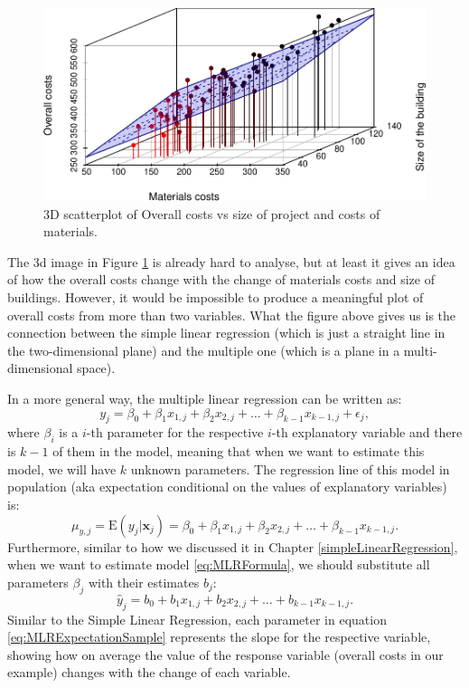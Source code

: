 \documentclass[
]{book}
\theoremstyle{definition}
\theoremstyle{definition}
\theoremstyle{definition}
\theoremstyle{definition}
\theoremstyle{remark}
\begin{document}
\begin{figure}
\centering
\includegraphics{Svetunkov---Statistics-for-Business-Analytics_files/figure-latex/scatterplot3dProjectCosts-1.pdf}
\caption{\label{fig:scatterplot3dProjectCosts}3D scatterplot of Overall costs vs size of project and costs of materials.}
\end{figure}

The 3d image in Figure \ref{fig:scatterplot3dProjectCosts} is already hard to analyse, but at least it gives an idea of how the overall costs change with the change of materials costs and size of buildings. However, it would be impossible to produce a meaningful plot of overall costs from more than two variables. What the figure above gives us is the connection between the simple linear regression (which is just a straight line in the two-dimensional plane) and the multiple one (which is a plane in a multi-dimensional space).

In a more general way, the multiple linear regression can be written as:
\begin{equation}
    y_j = \beta_0 + \beta_1 x_{1,j} + \beta_2 x_{2,j} + \dots + \beta_{k-1} x_{k-1,j} + \epsilon_j ,
    \label{eq:MLRFormula}
\end{equation}
where \(\beta_i\) is a \(i\)-th parameter for the respective \(i\)-th explanatory variable and there is \(k-1\) of them in the model, meaning that when we want to estimate this model, we will have \(k\) unknown parameters. The regression line of this model in population (aka expectation conditional on the values of explanatory variables) is:
\begin{equation}
    \mu_{y,j} = \mathrm{E}(y_j | \mathbf{x}_j) = \beta_0 + \beta_1 x_{1,j} + \beta_2 x_{2,j} + \dots + \beta_{k-1} x_{k-1,j} .
    \label{eq:MLRExpectation}
\end{equation}
Furthermore, similar to how we discussed it in Chapter \ref{simpleLinearRegression}, when we want to estimate model \eqref{eq:MLRFormula}, we should substitute all parameters \(\beta_j\) with their estimates \(b_j\):
\begin{equation}
    \hat{y}_j = b_0 + b_1 x_{1,j} + b_2 x_{2,j} + \dots + b_{k-1} x_{k-1,j} .
    \label{eq:MLRExpectationSample}
\end{equation}
Similar to the Simple Linear Regression, each parameter in equation \eqref{eq:MLRExpectationSample} represents the slope for the respective variable, showing how on average the value of the response variable (overall costs in our example) changes with the change of each variable.
\end{document}
